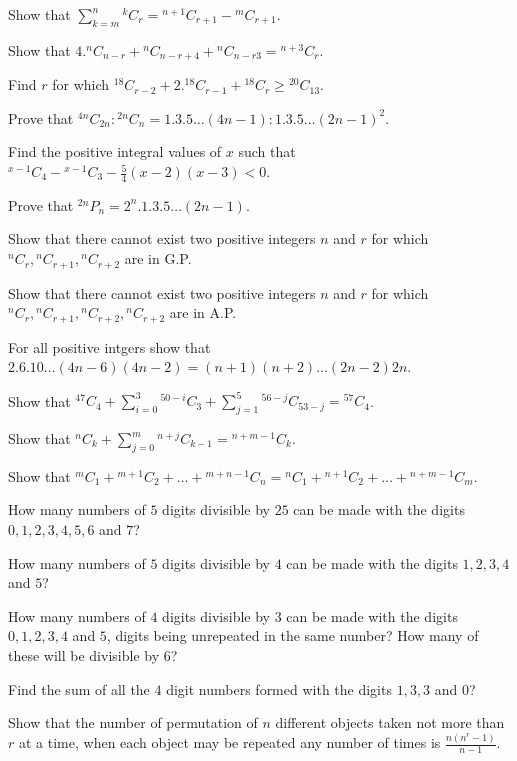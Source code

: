 \item Show that $\displaystyle \sum_{k=m}^n{}^{k}C_r = {}^{n + 1}C_{r + 1} - {}^{m}C_{r + 1}$.
\item Show that $4.{}^nC_{n - r} + {}^nC_{n - r + 4} + {}^nC_{n - r 3} = {}^{n + 3}C_r$.
\item Find $r$ for which ${}^{18}C_{r - 2} + 2.{}^{18}C_{r - 1} + {}^{18}C_r\geq {}^{20}C_{13}$.
\item Prove that ${}^{4n}C_{2n}:{}^{2n}C_n = 1.3.5\ldots(4n - 1):1.3.5\ldots(2n - 1)^2$.
\item Find the positive integral values of $x$ such that ${}^{x - 1}C_4 - {}^{x - 1}C_3 - \frac{5}{4}(x - 2)(x - 3) < 0$.
\item Prove that ${}^{2n}P_n = 2^n.1.3.5\ldots(2n - 1)$.
\item Show that there cannot exist two positive integers $n$ and $r$ for which ${}^nC_r, {}^nC_{r + 1}, {}^nC_{r + 2}$ are in G.P.
\item Show that there cannot exist two positive integers $n$ and $r$ for which ${}^nC_r, {}^nC_{r + 1}, {}^nC_{r + 2}, {}^nC_{r +
  2}$ are in A.P.
\item For all positive intgers show that $2.6.10\ldots (4n - 6)(4n - 2) = (n + 1)(n + 2)\ldots (2n - 2)2n$.
\item Show that $\displaystyle{}^{47}C_4 + \sum_{i=0}^3{}^{50 - i}C_3 + \sum_{j = 1}^5{}^{56 - j}C_{53 - j} = {}^{57}C_4$.
\item Show that $\displaystyle{}^nC_k + \sum_{j = 0}^m{}^{n + j}C_{k - 1} = {}^{n + m - 1}C_k$.
\item Show that ${}^{m}C_1 + {}^{m + 1}C_2 + \ldots + {}^{m + n - 1}C_n = {}^{n}C_1 + {}^{n + 1}C_2 + \ldots + {}^{n + m - 1}C_m$.
\item How many numbers of $5$ digits divisible by $25$ can be made with the digits $0, 1, 2, 3, 4, 5, 6$ and $7$?
\item How many numbers of $5$ digits divisible by $4$ can be made with the digits $1, 2, 3, 4$ and $5$?
\item How many numbers of $4$ digits divisible by $3$ can be made with the digits $0, 1, 2, 3, 4$ and $5$, digits being unrepeated
  in the same number? How many of these will be divisible by $6$?
\item Find the sum of all the $4$ digit numbers formed with the digits $1, 3, 3$ and $0$?
\item Show that the number of permutation of $n$ different objects taken not more than $r$ at a time, when each object may be
  repeated any number of times is $\frac{n(n^r - 1)}{n - 1}$.
